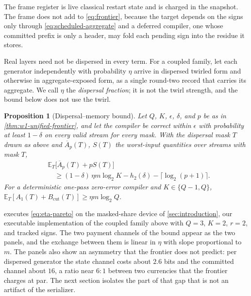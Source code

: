 \documentclass[aps,prx,reprint,superscriptaddress,floatfix,longbibliography]{revtex4-2}
\newtheorem{proposition}{Proposition}
\begin{document}
The frame register is live classical restart state and is charged in the
snapshot.  The frame does not add to \cref{eq:frontier}, because the
target depends on the signs only through \cref{eq:scheduled-aggregate} and
a deferred compiler, one whose committed prefix is only a header, may fold
each pending sign into the residue it stores.

Real layers need not be dispersed in every term.  For a coupled family,
let each generator independently with probability $\eta$ arrive in
dispersed twirled form and otherwise in aggregate-exposed form, as a
single round-two record that carries its aggregate.  We call $\eta$ the \emph{dispersal fraction}; it
is not the twirl strength, and the bound below does not use the twirl.

\begin{proposition}[Dispersal--memory bound]
\label{prop:eta-pareto}
Let $Q$, $K$, $\epsilon$, $\delta$, and $p$ be as in
\cref{thm:w1-unified-frontier}, and let the compiler be correct within
$\epsilon$ with probability at least $1-\delta$ on every valid stream for
every mask.  With the dispersal mask $T$ drawn as above and $\overline A_p(T)$, $S(T)$ the
worst-input quantities over streams with mask $T$,
\begin{equation}\label{eq:eta-pareto}
\begin{aligned}
 &\mathbb E_T\bigl[\overline A_p(T)+pS(T)\bigr]\\
 &\quad\geq(1-\delta)\,\eta m\log_2K-h_2(\delta)-\lceil\log_2(p+1)\rceil.
\end{aligned}
\end{equation}
For a deterministic one-pass zero-error compiler and $K\in\{Q-1,Q\}$,
$\mathbb E_T[A_1(T)+B_{\mathrm{cut}}(T)]\geq\eta m\log_2Q$.
\end{proposition}

 executes \cref{eq:eta-pareto} on the masked-share
device of \cref{sec:introduction}, our executable implementation of the
coupled family above with $Q=3$, $K=2$, $r=2$, and tracked signs.
The two payment channels of the bound appear as the two panels, and the
exchange between them is linear in $\eta$ with slope proportional to $m$.
The panels also show an asymmetry that the frontier does not predict: per
dispersed generator the state channel costs about $2.6$ bits and the
committed channel about $16$, a ratio near $6{:}1$ between two currencies
that the frontier charges at par.  The next section isolates the part of
that gap that is not an artifact of the serializer.
\end{document}
